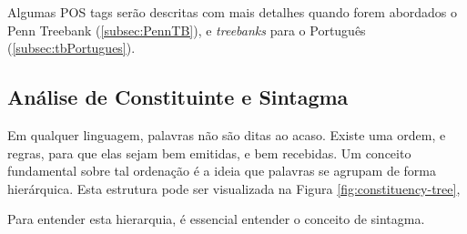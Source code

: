 Algumas POS tags serão descritas com mais detalhes quando forem abordados o Penn Treebank (\ref{subsec:PennTB}), e \textit{treebanks} para o Português (\ref{subsec:tbPortugues}).


\subsection{Análise de Constituinte e Sintagma}
\label{subsec:analiseConstSintagma}

Em qualquer linguagem, palavras não são ditas ao acaso. Existe uma ordem, e regras, para que elas sejam bem emitidas, e bem recebidas. Um conceito fundamental sobre tal ordenação é a ideia que palavras se agrupam de forma hierárquica. 
Esta estrutura pode ser visualizada na Figura \ref{fig:constituency-tree},
\begin{center}

\end{center}
Para entender esta hierarquia, é essencial entender o conceito de sintagma. 

